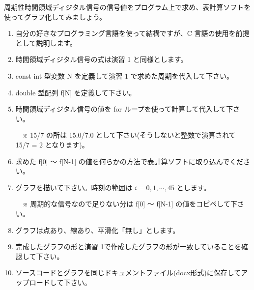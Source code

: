 \documentclass[a4paper]{jarticle}
\begin{document}
 周期性時間領域ディジタル信号の信号値をプログラム上で求め、表計算ソフトを使ってグラフ化してみましょう。\par
\par\vspace{1zh}
\begin{enumerate}
\item 自分の好きなプログラミング言語を使って結構ですが、C 言語の使用を前提として説明します。
\item 時間領域ディジタル信号の式は演習 1 と同様とします。
\item const int 型変数 N を定義して演習 1 で求めた周期を代入して下さい。
\item double 型配列 f[N] を定義して下さい。
\item 時間領域ディジタル信号の値を for ループを使って計算して代入して下さい。\par
　※ 15/7 の所は 15.0/7.0 として下さい(そうしないと整数で演算されて 15/7 = 2 となります)。
\item 求めた f[0] 〜 f[N-1] の値を何らかの方法で表計算ソフトに取り込んでください。
\item グラフを描いて下さい。時刻の範囲は $i = 0, 1,  \cdots, 45$ とします。\par
　※ 周期的な信号なので足りない分は f[0] 〜 f[N-1] の値をコピペして下さい。
\item グラフは点あり、線あり、平滑化「無し」とします。
\item 完成したグラフの形と演習 1で作成したグラフの形が一致していることを確認して下さい。
\item ソースコードとグラフを同じドキュメントファイル(docx形式)に保存してアップロードして下さい。
\end{enumerate}
\end{document}
